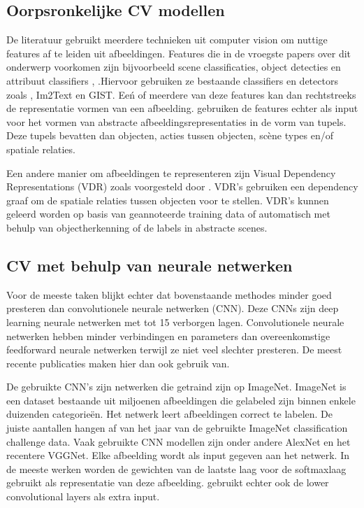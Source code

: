 \subsection{Oorpsronkelijke CV modellen}
De literatuur gebruikt meerdere technieken uit computer vision om nuttige features af te leiden uit afbeeldingen. Features die in de vroegste papers over dit onderwerp voorkomen zijn bijvoorbeeld scene classificaties, object detecties en attribuut classifiers \cite{Farhadi},\cite{Yang}\cite{Patterson} .Hiervoor gebruiken ze bestaande classifiers en detectors zoals \cite{Felzenszwalb}, Im2Text \cite{Ordonez} en GIST\cite{Oliva}. Ee\'n of meerdere van deze features kan dan rechtstreeks de representatie vormen van een afbeelding. \cite{Farhadi} \cite{Yang} \cite{Li} \cite{Mitchell} gebruiken de features echter als input voor het vormen van abstracte afbeeldingsrepresentaties in de vorm van tupels. Deze tupels bevatten dan objecten, acties tussen objecten, sc\`ene types en/of spatiale relaties.

Een andere manier om afbeeldingen te representeren zijn Visual Dependency Representations (VDR) zoals voorgesteld door \cite{Eliott2013}. VDR's gebruiken een dependency graaf om de spatiale relaties tussen objecten voor te stellen. VDR's kunnen geleerd worden op basis van geannoteerde training data of automatisch met behulp van objectherkenning \cite{Eliott2015} of de labels in abstracte scenes. \cite{Ortiz} 

\subsection{CV met behulp van neurale netwerken}
Voor de meeste taken blijkt echter dat  bovenstaande methodes minder goed presteren dan convolutionele neurale netwerken (CNN). Deze CNNs zijn deep learning neurale netwerken met tot 15 verborgen lagen. Convolutionele neurale netwerken hebben minder verbindingen en parameters dan overeenkomstige feedforward neurale netwerken terwijl ze niet veel slechter presteren. \cite{Krizhevsky} De meest recente publicaties maken hier dan ook gebruik van. 

De gebruikte CNN's zijn netwerken die getraind zijn op ImageNet.\cite{imagenet} ImageNet is een dataset bestaande uit miljoenen afbeeldingen die gelabeled zijn binnen enkele duizenden categorie\"en. Het netwerk leert afbeeldingen correct te labelen. De juiste aantallen hangen af van het jaar van de gebruikte ImageNet classification challenge data. Vaak gebruikte CNN modellen zijn onder andere AlexNet \cite{Krizhevsky} en het recentere VGGNet\cite{Simonyan}. Elke afbeelding wordt als input gegeven aan het netwerk. In de meeste werken worden de gewichten van de laatste laag voor de softmaxlaag gebruikt als representatie van deze afbeelding.  \cite{Xu attention} gebruikt echter ook de lower convolutional layers als extra input.

